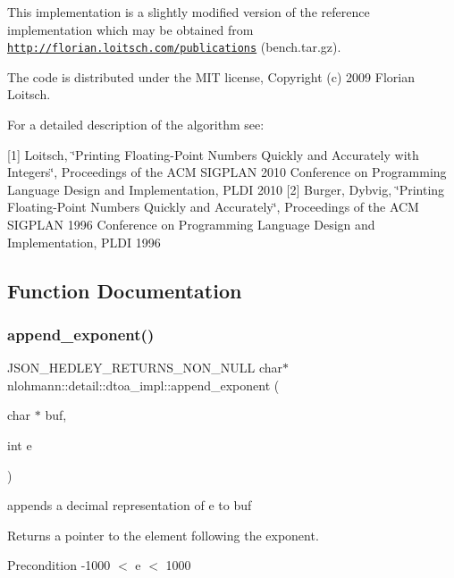 This implementation is a slightly modified version of the reference implementation which may be obtained from \href{http://florian.loitsch.com/publications}{\tt http\+://florian.\+loitsch.\+com/publications} (bench.\+tar.\+gz).

The code is distributed under the M\+IT license, Copyright (c) 2009 Florian Loitsch.

For a detailed description of the algorithm see\+:

\mbox{[}1\mbox{]} Loitsch, \char`\"{}\+Printing Floating-\/\+Point Numbers Quickly and Accurately with
    Integers\char`\"{}, Proceedings of the A\+CM S\+I\+G\+P\+L\+AN 2010 Conference on Programming Language Design and Implementation, P\+L\+DI 2010 \mbox{[}2\mbox{]} Burger, Dybvig, \char`\"{}\+Printing Floating-\/\+Point Numbers Quickly and Accurately\char`\"{}, Proceedings of the A\+CM S\+I\+G\+P\+L\+AN 1996 Conference on Programming Language Design and Implementation, P\+L\+DI 1996 

\subsection{Function Documentation}
\mbox{\label{namespacenlohmann_1_1detail_1_1dtoa__impl_ad90f19ed10d8133b727df4b9bc5ddf5c}} 
\subsubsection{\texorpdfstring{append\+\_\+exponent()}{append\_exponent()}}
{\footnotesize\ttfamily J\+S\+O\+N\+\_\+\+H\+E\+D\+L\+E\+Y\+\_\+\+R\+E\+T\+U\+R\+N\+S\+\_\+\+N\+O\+N\+\_\+\+N\+U\+LL char$\ast$ nlohmann\+::detail\+::dtoa\+\_\+impl\+::append\+\_\+exponent (\begin{DoxyParamCaption}\item[{char $\ast$}]{buf,  }\item[{int}]{e }\end{DoxyParamCaption})\hspace{0.3cm}{\ttfamily [inline]}}



appends a decimal representation of e to buf 

\begin{DoxyReturn}{Returns}
a pointer to the element following the exponent. 
\end{DoxyReturn}
\begin{DoxyPrecond}{Precondition}
-\/1000 $<$ e $<$ 1000 
\end{DoxyPrecond}
\mbox{\label{namespacenlohmann_1_1detail_1_1dtoa__impl_a22b6e37654ac93c6d0d9c06ec1bf5ded}} 

